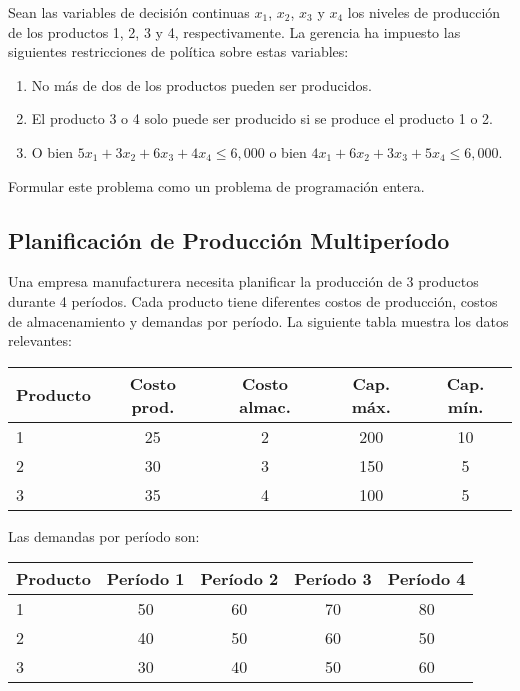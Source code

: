\documentclass[12pt]{article}
\begin{document}
Sean las variables de decisión continuas $x_1$, $x_2$, $x_3$ y $x_4$ los niveles de producción de los productos 1, 2, 3 y 4, respectivamente. La gerencia ha impuesto las siguientes restricciones de política sobre estas variables:

\begin{enumerate}[label=\arabic*.]
    \item No más de dos de los productos pueden ser producidos.
    \item El producto 3 o 4 solo puede ser producido si se produce el producto 1 o 2.
    \item O bien $5x_1 + 3x_2 + 6x_3 + 4x_4 \leq 6,000$ o bien $4x_1 + 6x_2 + 3x_3 + 5x_4 \leq 6,000$.
\end{enumerate}

Formular este problema como un problema de programación entera.

\subsection{Planificación de Producción Multiperíodo}
Una empresa manufacturera necesita planificar la producción de 3 productos durante 4 períodos. Cada producto tiene diferentes costos de producción, costos de almacenamiento y demandas por período. La siguiente tabla muestra los datos relevantes:

\begin{table}[h]
\centering
\begin{tabular}{lcccc}
\toprule
\textbf{Producto} & \textbf{Costo prod.} & \textbf{Costo almac.} & \textbf{Cap. máx.} & \textbf{Cap. mín.} \\
\midrule
1 & 25 & 2 & 200 & 10 \\
2 & 30 & 3 & 150 & 5 \\
3 & 35 & 4 & 100 & 5 \\
\bottomrule
\end{tabular}
\end{table}

Las demandas por período son:
\begin{table}[h]
\centering
\begin{tabular}{lcccc}
\toprule
\textbf{Producto} & \textbf{Período 1} & \textbf{Período 2} & \textbf{Período 3} & \textbf{Período 4} \\
\midrule
1 & 50 & 60 & 70 & 80 \\
2 & 40 & 50 & 60 & 50 \\
3 & 30 & 40 & 50 & 60 \\
\bottomrule
\end{tabular}
\end{table}
\end{document}
